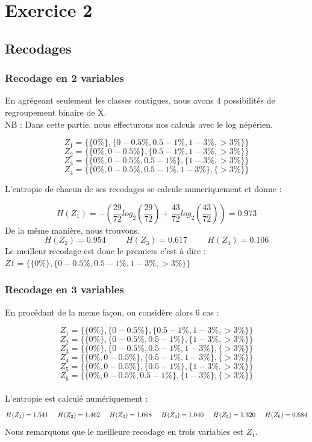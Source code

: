 \documentclass{article}
\begin{document}
\newpage
\section{Exercice 2}
\label{exercice2}
\subsection{Recodages}

\subsubsection{Recodage en 2 variables}

En agrégeant seulement les classes contigues, nous avons 4 possibilités de regroupement binaire de 
X.
\\
 NB : Dans cette partie, nous effecturons nos calculs avec le log népérien.


\[
Z_1 =\{ \{0 \% \} , \{0 - 0.5 \% ,0.5-1 \% ,1-3 \% ,>3 \% \} \}  
\]
\[
Z_2 =\{ \{0 \% , 0 - 0.5 \%  \} , \{0.5-1 \% ,1-3 \% ,>3 \% \} \}
\]
\[
Z_3 =\{ \{0 \%, 0 - 0.5 \% ,0.5-1 \%  \} , \{1-3 \% ,>3 \% \} \}
\]
\[
Z_4 =\{ \{0 \% , 0 - 0.5 \% ,0.5-1 \% ,1-3 \% \} , \{>3 \% \} \}
\]


L'entropie de chacun de ses recodages se calcule numeriquement et donne :

\[
H(Z_1) = -\left(\frac{29}{72}log_2(\frac{29}{72})+\frac{43}{72}log_2(\frac{43}{72})\right) = 0.973
\]
De la même manière, nous trouvons.
\[
H(Z_2) = 0.954 \hspace{1cm} H(Z_3) = 0.617 \hspace{1cm} H(Z_4) = 0.106
\]
Le meilleur recodage est donc le premiers c'est à dire :
$Z1 =\{ \{0 \% \} , \{0 - 0.5 \% ,0.5-1 \% ,1-3 \% ,>3 \% \} \}$


\subsubsection{Recodage en 3 variables}

En procédant de la meme façon, on considère alors 6 cas :

\[
Z_1 =\{ \{0 \% \} , \{0 - 0.5 \%\} ,\{0.5-1 \% ,1-3 \% ,>3 \% \} \}  
\]
\[
  Z_2 =\{ \{0 \% \} , \{0 - 0.5\%, 0.5-1 \% \} ,\{1-3 \% ,>3 \% \} \}
\]
\[
  Z_3 =\{ \{0 \% \} , \{0 - 0.5\%, 0.5-1 \% ,1-3 \%  \} ,\{>3 \% \} \}
\]
\[
  Z_4 =\{ \{0 \%, 0 - 0.5\%\} , \{ 0.5-1 \% ,1-3 \%  \} ,\{>3 \% \} \}
\]
\[
  Z_5 =\{ \{0 \%, 0 - 0.5\%\} , \{ 0.5-1 \% \} ,\{1-3 \% , >3 \% \} \}
\]
\[
  Z_6 =\{ \{0 \%, 0 - 0.5\%,  0.5-1 \% \} , \{1-3 \%  \} ,\{>3 \% \} \}
\]
\\
L'entropie est calculé numériquement :
\[
H(Z_1) = 1.541 \hspace{0.5cm} H(Z_2) = 1.462 \hspace{0.5cm} H(Z_3) = 1.068 \hspace{0.5cm} H(Z_4) = 1.040 \hspace{0,5cm} H(Z_5) = 1.320 \hspace{0,5 cm} H(Z_6) = 0.684
\]
Nous remarquons que le meilleure recodage en trois variables est $Z_1$.
\end{document}
